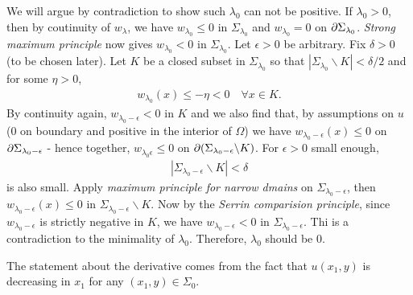 \documentclass[12pt,a4paper]{article}
\newenvironment{proof}
{\begin{changemargin}{1cm}{0.5cm} 
	}%
	{\end{changemargin}
}
\newenvironment{p}
{\begin{proof} 
	}%
	{\end{proof}
}
\begin{document}
\begin{p}
\quad We will argue by contradiction to show such $\lambda_0$ can not be positive. If $\lambda_0 >0$, then by coutinuity of $w_{\lambda}$, we have $w_{\lambda_0} \leq 0$ in $\Sigma_{\lambda_0}$ and $w_{\lambda_0} =0$ on $\partial \Sigma_{\lambda_0}$. \emph{Strong maximum principle} now gives $w_{\lambda_0} < 0$ in $\Sigma_{\lambda_0}$.  Let $\epsilon >0$ be arbitrary. Fix $\delta >0$ (to be chosen later). Let $K$ be a closed subset in $\Sigma_{\lambda_0}$ so that $|\Sigma_{\lambda_0} \backslash K| < \delta/2$ and for some $\eta >0$,
\begin{align*}
w_{\lambda_0}(x) \leq -\eta <0 \quad \forall x\in K.
\end{align*}
By continuity again, $w_{\lambda_0 - \epsilon} < 0$ in $K$ and we also find that, by assumptions on $u$ (0 on boundary and positive in the interior of $\Omega$) we have $w_{\lambda_0 - \epsilon}(x) \leq 0$ on $\partial \Sigma_{\lambda_0 - \epsilon}$ - hence together, $w_{\lambda_0 \epsilon} \leq 0$ on $\partial (\Sigma_{\lambda_0 -\epsilon} \backslash K)$. For $\epsilon >0$ small enough,
\begin{align*}
|\Sigma_{\lambda_0 -\epsilon} \backslash K| < \delta
\end{align*}
is also small. Apply \emph{maximum principle for narrow dmains} on $\Sigma_{\lambda_0 - \epsilon}$, then $w_{\lambda_0 - \epsilon}(x) \leq 0$ in $\Sigma_{\lambda_0 - \epsilon} \backslash K$. Now by the \emph{Serrin comparision principle}, since $w_{\lambda_0 -\epsilon}$ is strictly negative in $K$, we have $w_{\lambda_0 - \epsilon} < 0$ in $\Sigma_{\lambda_0 -\epsilon}$. Thi is a contradiction to the minimality of $\lambda_0$. Therefore, $\lambda_0$ should be 0.
\s

The statement about the derivative comes from the fact that $u(x_1, y)$ is decreasing in $x_1$ for any $(x_1, y) \in \Sigma_0$.

\eop
\end{p}
\end{document}
